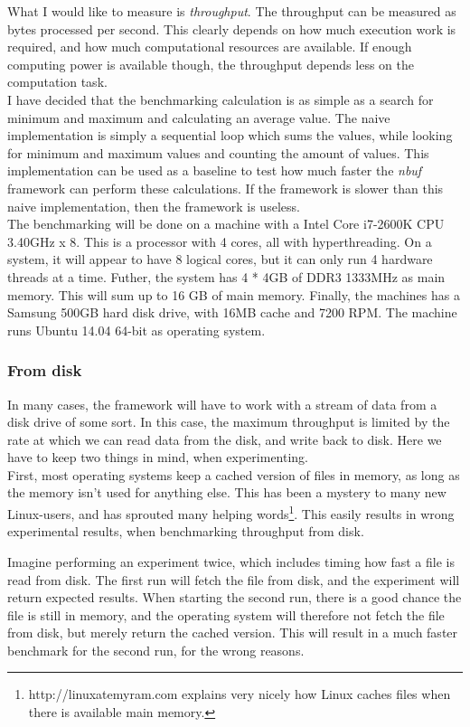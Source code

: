 \documentclass[a4paper]{article}
\newcommand{\nbuf}{\textit{nbuf} }
\begin{document}
What I would like to measure is \textit{throughput}. The throughput can be measured as bytes processed per second. This clearly depends on how much execution work is required, and how much computational resources are available. If enough computing power is available though, the throughput depends less on the computation task.\\

I have decided that the benchmarking calculation is as simple as a search for minimum and maximum and calculating an average value. The naive implementation is simply a sequential loop which sums the values, while looking for minimum and maximum values and counting the amount of values. This implementation can be used as a baseline to test how much faster the \nbuf framework can perform these calculations. If the framework is slower than this naive implementation, then the framework is useless.\\

The benchmarking will be done on a machine with a Intel Core i7-2600K CPU 3.40GHz x 8. This is a processor with 4 cores, all with hyperthreading. On a system, it will appear to have 8 logical cores, but it can only run 4 hardware threads at a time. Futher, the system has 4 * 4GB of DDR3 1333MHz as main memory. This will sum up to 16 GB of main memory. Finally, the machines has a Samsung 500GB hard disk drive, with 16MB cache and 7200 RPM. The machine runs Ubuntu 14.04 64-bit as operating system. 


\subsubsection{From disk}
In many cases, the framework will have to work with a stream of data from a disk drive of some sort. In this case, the maximum throughput is limited by the rate at which we can read data from the disk, and write back to disk. Here we have to keep two things in mind, when experimenting.\\

First, most operating systems keep a cached version of files in memory, as long as the memory isn't used for anything else. This has been a mystery to many new Linux-users, and has sprouted many helping words\footnote{http://linuxatemyram.com explains very nicely how Linux caches files when there is available main memory.}. This easily results in wrong experimental results, when benchmarking throughput from disk.

Imagine performing an experiment twice, which includes timing how fast a file is read from disk. The first run will fetch the file from disk, and the experiment will return expected results. When starting the second run, there is a good chance the file is still in memory, and the operating system will therefore not fetch the file from disk, but merely return the cached version. This will result in a much faster benchmark for the second run, for the wrong reasons.
\end{document}
